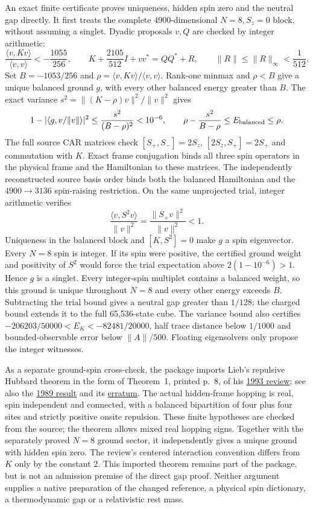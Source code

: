 An exact finite certificate proves uniqueness, hidden spin zero and the
neutral gap directly. It first treats the complete 4900-dimensional
$N=8,S_z=0$ block, without assuming a singlet. Dyadic proposals $v,Q$
are checked by integer arithmetic:
\[
 \frac{\langle v,Kv\rangle}{\langle v,v\rangle}<-\frac{1055}{256},
 \qquad K+\frac{2105}{512}I+vv^*=QQ^*+R,
 \qquad \|R\|\le\|R\|_\infty<\frac1{512}.
\]
Set $B=-1053/256$ and $\rho=\langle v,Kv\rangle/\langle v,v\rangle$.
Rank-one minmax and $\rho<B$ give a unique balanced ground $g$, with
every other balanced energy greater than $B$. The exact variance
$s^2=\|(K-\rho)v\|^2/\|v\|^2$ gives
\[
 1-|\langle g,v/\|v\|\rangle|^2
 \le\frac{s^2}{(B-\rho)^2}<10^{-6},
 \qquad
 \rho-\frac{s^2}{B-\rho}\le E_{\rm balanced}\le\rho.
\]
The full source CAR matrices check
$[S_+,S_-]=2S_z$, $[2S_z,S_+]=2S_+$ and commutation with $K$.
Exact frame conjugation binds all three spin operators in the physical
frame and the Hamiltonian to these matrices. The independently reconstructed source
basis order binds both the balanced Hamiltonian and the
$4900\to3136$ spin-raising restriction. On the same unprojected trial,
integer arithmetic verifies
\[
 \frac{\langle v,S^2v\rangle}{\|v\|^2}
 =\frac{\|S_+v\|^2}{\|v\|^2}<1.
\]
Uniqueness in the balanced block and $[K,S^2]=0$ make $g$ a spin
eigenvector. Every $N=8$ spin is integer. If its spin were positive,
the certified ground weight and positivity of $S^2$ would force the
trial expectation above $2(1-10^{-6})>1$. Hence $g$ is a singlet.
Every integer-spin multiplet contains a balanced weight, so this ground
is unique throughout $N=8$ and every other energy exceeds $B$.
Subtracting the trial bound gives a neutral gap greater than $1/128$;
the charged bound extends it to the full 65,536-state cube.
The variance bound also certifies
$-206203/50000<E_K<-82481/20000$, half trace distance below $1/1000$
and bounded-observable error below $\|A\|/500$.
Floating eigensolvers only propose the integer witnesses.

As a separate ground-spin cross-check, the package imports Lieb's
repulsive Hubbard theorem in the form of Theorem~1, printed p.~8, of his
\href{https://arxiv.org/pdf/cond-mat/9311033}{1993 review}; see also the
\href{https://doi.org/10.1103/PhysRevLett.62.1201}{1989 result} and its
\href{https://doi.org/10.1103/PhysRevLett.62.1927.5}{erratum}.
The actual hidden-frame hopping is real, spin independent and connected,
with a balanced bipartition of four plus four sites and strictly positive
onsite repulsion. These finite hypotheses are checked from the source;
the theorem allows mixed real hopping signs. Together with the separately
proved $N=8$ ground sector, it independently gives a unique ground with
hidden spin zero. The review's centered interaction convention differs
from $K$ only by the constant $2$. This imported theorem remains part of
the package, but is not an admission premise of the direct gap proof.
Neither argument supplies a native preparation of the changed reference,
a physical spin dictionary, a thermodynamic gap or a relativistic rest mass.

